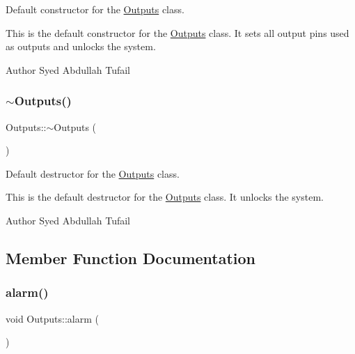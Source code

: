 Default constructor for the \hyperlink{classOutputs}{Outputs} class. 

This is the default constructor for the \hyperlink{classOutputs}{Outputs} class. It sets all output pins used as outputs and unlocks the system.

\begin{DoxyAuthor}{Author}
Syed Abdullah Tufail 
\end{DoxyAuthor}
\mbox{\label{classOutputs_a77531126d059e84abe973ded897f6cf1}} 
\subsubsection{\texorpdfstring{$\sim$\+Outputs()}{~Outputs()}}
{\footnotesize\ttfamily Outputs\+::$\sim$\+Outputs (\begin{DoxyParamCaption}{ }\end{DoxyParamCaption})\hspace{0.3cm}{\ttfamily [private]}}



Default destructor for the \hyperlink{classOutputs}{Outputs} class. 

This is the default destructor for the \hyperlink{classOutputs}{Outputs} class. It unlocks the system.

\begin{DoxyAuthor}{Author}
Syed Abdullah Tufail 
\end{DoxyAuthor}


\subsection{Member Function Documentation}
\mbox{\label{classOutputs_a610431c941db0b5c750f55ae47ce1783}} 
\subsubsection{\texorpdfstring{alarm()}{alarm()}}
{\footnotesize\ttfamily void Outputs\+::alarm (\begin{DoxyParamCaption}{ }\end{DoxyParamCaption})\hspace{0.3cm}{\ttfamily [private]}}



